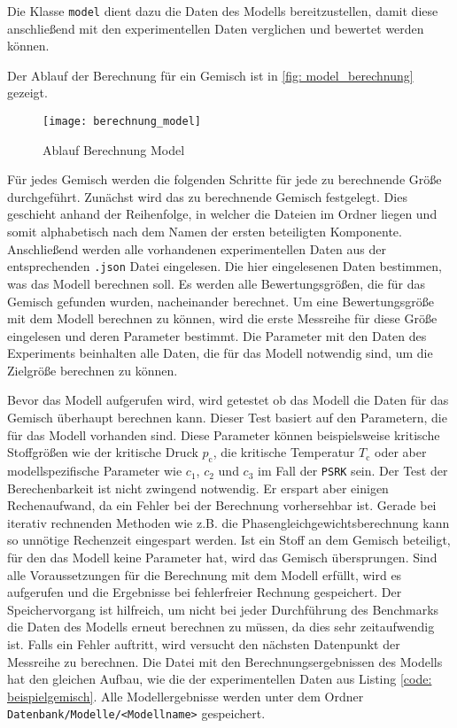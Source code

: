 \documentclass[../thesis.tex]{subfiles}
\begin{document}
Die Klasse \texttt{model} dient dazu die Daten des Modells bereitzustellen, damit diese anschließend mit den experimentellen Daten verglichen und bewertet werden können.

Der Ablauf der Berechnung für ein Gemisch ist in \autoref{fig: model_berechnung} gezeigt.

\begin{figure}[htb]
	\centering
	\texttt{[image: berechnung\_model]}
	\caption{Ablauf Berechnung Model}
	\label{fig: model_berechnung}
\end{figure}

Für jedes Gemisch werden die folgenden Schritte für jede zu berechnende Größe durchgeführt. Zunächst wird das zu berechnende Gemisch festgelegt. Dies geschieht anhand der Reihenfolge, in welcher die Dateien im Ordner liegen und somit alphabetisch nach dem Namen der ersten beteiligten Komponente. Anschließend werden alle vorhandenen experimentellen Daten aus der entsprechenden \texttt{.json} Datei eingelesen. Die hier eingelesenen Daten bestimmen, was das Modell berechnen soll. Es werden alle Bewertungsgrößen, die für das Gemisch gefunden wurden, nacheinander berechnet. Um eine Bewertungsgröße mit dem Modell berechnen zu können, wird die erste Messreihe für diese Größe eingelesen und deren Parameter bestimmt. Die Parameter mit den Daten des Experiments beinhalten alle Daten, die für das Modell notwendig sind, um die Zielgröße berechnen zu können.

Bevor das Modell aufgerufen wird, wird getestet ob das Modell die Daten für das Gemisch überhaupt berechnen kann. Dieser Test basiert auf den Parametern, die für das Modell vorhanden sind. Diese Parameter können beispielsweise kritische Stoffgrößen wie der kritische Druck $p_\mathrm{c}$, die kritische Temperatur $T_\mathrm{c}$ oder aber modellspezifische Parameter wie $c_1$, $c_2$ und $c_3$ im Fall der \texttt{PSRK} sein. Der Test der Berechenbarkeit ist nicht zwingend notwendig. Er erspart aber einigen Rechenaufwand, da ein Fehler bei der Berechnung vorhersehbar ist. Gerade bei iterativ rechnenden Methoden wie z.B. die Phasengleichgewichtsberechnung kann so unnötige Rechenzeit eingespart werden. Ist ein Stoff an dem Gemisch beteiligt, für den das Modell keine Parameter hat, wird das Gemisch übersprungen.
Sind alle Voraussetzungen für die Berechnung mit dem Modell erfüllt, wird es aufgerufen und die Ergebnisse bei fehlerfreier Rechnung gespeichert. Der Speichervorgang ist hilfreich, um nicht bei jeder Durchführung des Benchmarks die Daten des Modells erneut berechnen zu müssen, da dies sehr zeitaufwendig ist. Falls ein Fehler auftritt, wird versucht den nächsten Datenpunkt der Messreihe zu berechnen. Die Datei mit den Berechnungsergebnissen des Modells hat den gleichen Aufbau, wie die der experimentellen Daten aus Listing \autoref{code: beispielgemisch}. Alle Modellergebnisse werden unter dem Ordner \texttt{Datenbank/Modelle/<Modellname>} gespeichert.
\end{document}
